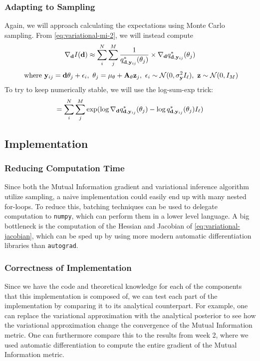 \subsubsection{Adapting to Sampling}
Again, we will approach calculating the expectations using Monte Carlo sampling. From \eqref{eq:variational-mi-2}, we will instead compute
\begin{equation}\nabla_{\mathbf{d}} I(\mathbf{d}) \approx \sum_{i}^N \sum_{j}^M \frac{1}{q^*_{\mathbf{d}, \mathbf{y}_{ij}}(\theta_{j})}\times \nabla_{\mathbf{d}}q^*_{\mathbf{d}, \mathbf{y}_{ij}}(\theta_{j})\end{equation}
$$\ \textrm{where}\ \B{y}_{ij} = \B{d}\theta_j + \epsilon_i,\ \theta_j = \mu_\theta + \B{A}_\theta\B{z}_j,\ \epsilon_i \sim \mathcal{N}(0, \sigma^2_\B{y} I_\ell),\ \B{z} \sim \mathcal{N}(0, I_M)$$
To try to keep numerically stable, we will use the log-sum-exp trick:
\begin{equation}= \sum_{i}^N \sum_{j}^M \exp (\log \nabla_{\mathbf{d}}q^*_{\mathbf{d}, \mathbf{y}_{ij}}(\theta_{j})- \log q^*_{\mathbf{d}, \mathbf{y}_{ij}}(\theta_{j})I_\ell) \label{eq:sample-mi-var}\end{equation}


\subsection{Implementation}
\subsubsection{Reducing Computation Time}
Since both the Mutual Information gradient and variational inference algorithm utilize sampling, a naive implementation could easily end up with many nested for-loops.
To reduce this, batching techniques can be used to delegate computation to \texttt{numpy}, which can perform them in a lower level language. 
A big bottleneck is the computation of the Hessian and Jacobian of \eqref{eq:variational-jacobian}, which can be sped up by using more modern automatic differentiation libraries than \texttt{autograd}.
\subsubsection{Correctness of Implementation}
Since we have the code and theoretical knowledge for each of the components that this implementation is composed of, 
we can test each part of the implementation by comparing it to its analytical counterpart. 
For example, one can replace the variational approximation with the analytical posterior to see how the variational approximation change the convergence of the Mutual Information metric.
One can furthermore compare this to the results from week 2, where we used automatic differentiation to compute the entire gradient of the Mutual Information metric.
